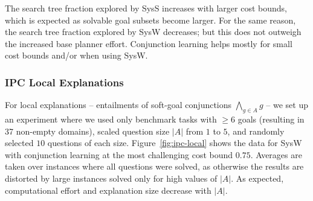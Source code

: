 The search tree fraction explored by SysS increases with larger cost
bounds, which is expected as solvable goal subsets become larger. For
the same reason, the search tree fraction explored by SysW decreases;
but this does not outweigh the increased base planner
effort. Conjunction learning helps mostly for small cost bounds and/or
when using SysW.
%
%



\subsubsection{IPC Local Explanations}

For local explanations -- entailments of soft-goal conjunctions
$\bigwedge_{g \in A} g$ -- we set up an experiment where we used only
benchmark tasks with $\geq 6$ goals (resulting in 37 non-empty
domains), scaled question size $|A|$ from $1$ to $5$, and randomly
selected $10$ questions of each size. Figure~\ref{fig:ipc-local} shows
the data for SysW with conjunction learning at the most
challenging cost bound $0.75$.
%
Averages are taken over instances where all questions were solved, as
otherwise the results are distorted by large instances solved only for
high values of $|A|$.
%
As expected, computational effort and explanation size decrease with
$|A|$.

